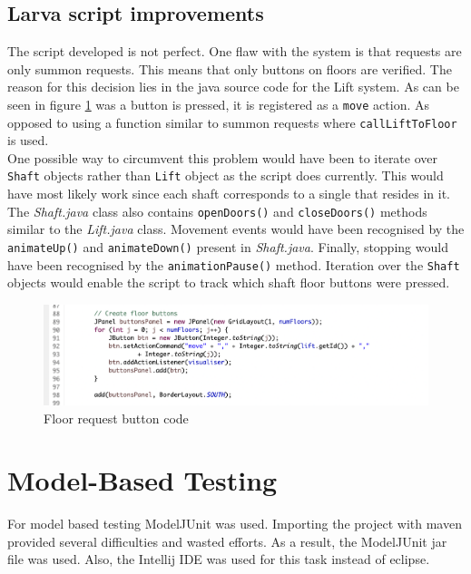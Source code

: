 \documentclass[a4paper, 12pt]{article}
\begin{document}
\subsection{Larva script improvements}
The script developed is not perfect. One flaw with the system is that requests are only summon requests. This means that only buttons on floors are verified. The reason for this decision lies in the java source code for the Lift system. As can be seen in figure \ref{fig:floor-request-code} was a button is pressed, it is registered as a \texttt{move} action. As opposed to using a function similar to summon requests where \texttt{callLiftToFloor} is used. \\

One possible way to circumvent this problem would have been to iterate over \texttt{Shaft} objects rather than \texttt{Lift} object as the script does currently. This would have most likely work since each shaft corresponds to a single that resides in it. The \textit{Shaft.java} class also contains \texttt{openDoors()} and \texttt{closeDoors()} methods similar to the \textit{Lift.java} class. Movement events would have been recognised by the \texttt{animateUp()} and \texttt{animateDown()} present in \textit{Shaft.java}. Finally, stopping would have been recognised by the \texttt{animationPause()} method. Iteration over the \texttt{Shaft} objects would enable the script to track which shaft floor buttons were pressed. 

\begin{figure}
   \centering
   \includegraphics[width=\textwidth,height=\textheight,keepaspectratio]{images/floor-request-code} %
   \caption{Floor request button code}
   \label{fig:floor-request-code}
\end{figure}



\section{Model-Based Testing}
For model based testing ModelJUnit was used. Importing the project with maven provided several difficulties and wasted efforts. As a result, the ModelJUnit jar file was used. Also, the Intellij IDE was used for this task instead of eclipse. \\
\end{document}
